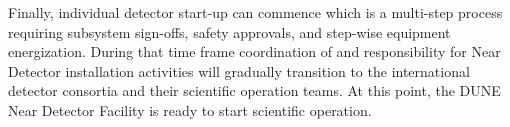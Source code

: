 Finally, individual detector start-up can commence which is a multi-step process requiring subsystem sign-offs, safety approvals, and step-wise equipment energization. During that time frame coordination of and responsibility for Near Detector installation activities will gradually transition to the international detector consortia and their scientific operation teams. At this point, the DUNE Near Detector Facility is ready to start scientific operation.

